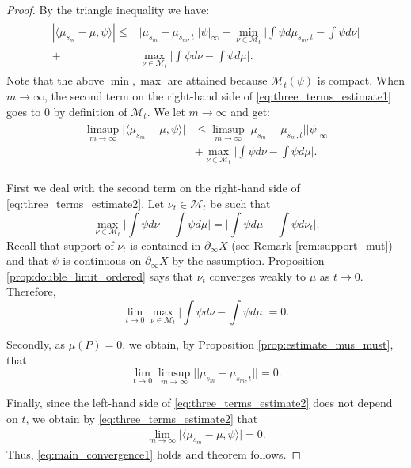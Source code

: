 \documentclass[12pt]{amsbook}%
\theoremstyle{definition}
\theoremstyle{remark}
\numberwithin{section}{chapter}
\numberwithin{subsection}{section}
\numberwithin{figure}{chapter}
\def\cM{{\mathscr{M}}}
\def\geo{\partial_\infty}
\begin{document}
{{\begin{proof}
By the triangle inequality we have:
\begin{align}
\begin{aligned}\label{eq:three_terms_estimate1}
\left\vert\langle \mu_{s_m} - \mu, \psi\rangle\right\vert
\leqslant & \vert \mu_{s_m} - \mu_{s_m,t}\vert \vert \psi\vert_\infty 
+\min_{\nu\in \cM_t}\vert \int \psi d\mu_{s_m,t}-\int\psi  d\nu  \vert\\
+&\max_{\nu\in \cM_t}\vert \int \psi d\nu-\int\psi  d\mu \vert.
\end{aligned}
\end{align}
Note that the above $\min,\max$ are attained because $\cM_t(\psi)$ is compact. When $m\rightarrow\infty$, the second term on the right-hand side of \eqref{eq:three_terms_estimate1} goes to $0$ by definition of $\cM_t$. We let $m\rightarrow\infty$ and get:
\begin{align}
\begin{aligned}\label{eq:three_terms_estimate2}
\limsup_{m\rightarrow\infty}\vert\langle \mu_{s_m} - \mu, \psi\rangle\vert
&\leqslant  \limsup_{m\rightarrow\infty}\vert \mu_{s_m} - \mu_{s_m,t}\vert \vert \psi\vert_\infty \\
& + \max_{\nu\in \cM_t}\vert \int \psi d\nu-\int\psi  d\mu \vert.
\end{aligned}
\end{align}

First we deal with the second term on the right-hand side of \eqref{eq:three_terms_estimate2}. Let $\nu_t\in \cM_t$ be such that 
\[
\max_{\nu\in \cM_t}\vert \int \psi d\nu-\int\psi  d\mu \vert=\vert\int\psi d\mu-\int\psi d\nu_t\vert.
\]
Recall that support of $\nu_t$ is contained in $\geo X$ (see Remark \ref{rem:support_mut}) and that $\psi$ is continuous on $\geo X$ by the assumption. Proposition \ref{prop:double_limit_ordered} says that $\nu_t$ converges weakly to $\mu$ as $t\rightarrow 0$. Therefore,  
\begin{equation}\label{eq:three_terms_estimate3}
\lim_{t\rightarrow 0}\max_{\nu\in \cM_t}\vert \int \psi d\nu-\int\psi d\mu \vert=0.
\end{equation}

Secondly, as $\mu(P)=0$, we obtain, by Proposition \ref{prop:estimate_mus_must}, that
\[\lim_{t\rightarrow 0}\limsup_{m\rightarrow\infty} \vert\vert \mu_{s_m} - \mu_{s_m,t}\vert\vert=0.\]

Finally, since the left-hand side of \eqref{eq:three_terms_estimate2} does not depend on $t$, we obtain by \eqref{eq:three_terms_estimate2} that
\begin{align*}
\lim_{m\rightarrow\infty}\vert\langle \mu_{s_m} - \mu, \psi\rangle\vert=0.
\end{align*}
Thus, \eqref{eq:main_convergence1} holds and theorem follows. %
\end{proof}





}}
\end{document}
